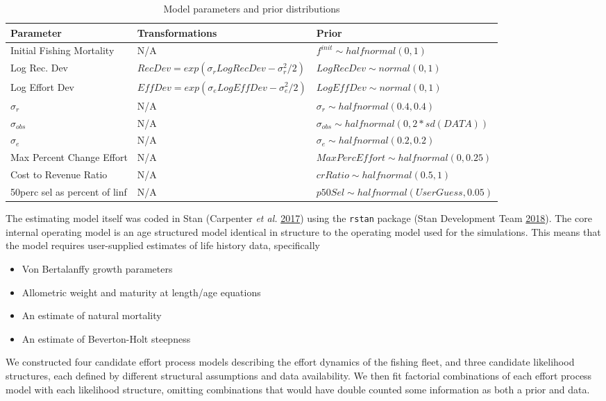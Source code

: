 \documentclass[twoside,12pt,final]{ucthesis-CA2012}
\begin{document}
\begin{ucmainmatter}
\begin{table}
\caption{\label{tab:prior-table}Model parameters and prior distributions}
\centering
\fontsize{9}{11}\selectfont
\begin{tabu} to 
\toprule
\textbf{Parameter} & \textbf{Transformations} & \textbf{Prior}\\
\midrule
Initial Fishing Mortality & N/A & $f^{init} \sim halfnormal(0,1)$\\
Log Rec. Dev & $RecDev = exp(\sigma_{r}LogRecDev - \sigma_{r}^2/2)$ & $LogRecDev \sim normal(0,1)$\\
Log Effort Dev & $EffDev = exp(\sigma_{e}LogEffDev - \sigma_{e}^2/2)$ & $LogEffDev \sim normal(0,1)$\\
$\sigma_r$ & N/A & $\sigma_r \sim halfnormal(0.4,0.4)$\\
$\sigma_{obs}$ & N/A & $\sigma_{obs} \sim halfnormal(0,2*sd(DATA))$\\
\addlinespace
$\sigma_e$ & N/A & $\sigma_e \sim halfnormal(0.2,0.2)$\\
Max Percent Change Effort & N/A & $MaxPercEffort \sim halfnormal(0, 0.25)$\\
Cost to Revenue Ratio & N/A & $crRatio \sim halfnormal(0.5, 1)$\\
50perc sel as percent of linf & N/A & $p50Sel \sim halfnormal(UserGuess, 0.05)$\\
\bottomrule
\end{tabu}
\end{table}
The estimating model itself was coded in Stan (Carpenter \emph{et al.}
\protect\hyperlink{ref-Carpenter2017}{2017}) using the \texttt{rstan}
package (Stan Development Team
\protect\hyperlink{ref-StanDevelopmentTeam2018}{2018}). The core
internal operating model is an age structured model identical in
structure to the operating model used for the simulations. This means
that the model requires user-supplied estimates of life history data,
specifically
\begin{itemize}
\item
  Von Bertalanffy growth parameters
\item
  Allometric weight and maturity at length/age equations
\item
  An estimate of natural mortality
\item
  An estimate of Beverton-Holt steepness
\end{itemize}
We constructed four candidate effort process models describing the
effort dynamics of the fishing fleet, and three candidate likelihood
structures, each defined by different structural assumptions and data
availability. We then fit factorial combinations of each effort process
model with each likelihood structure, omitting combinations that would
have double counted some information as both a prior and data.


\end{ucmainmatter}
\end{document}
